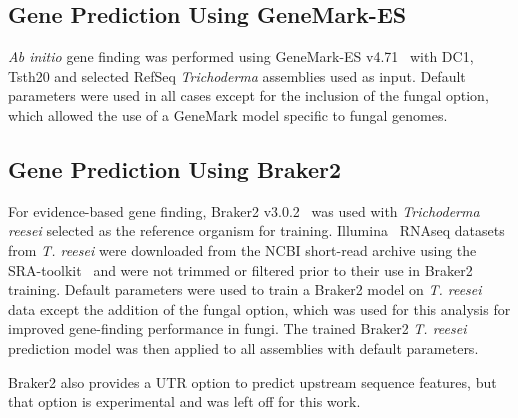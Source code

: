 \subsection{Gene Prediction Using GeneMark-ES}\label{met:genemark}


\textit{Ab initio} gene finding was performed using GeneMark-ES
v4.71~\cite{borodovsky2011a} with DC1, Tsth20 and selected RefSeq
\textit{Trichoderma} assemblies used as input. Default parameters were
used in all cases except for the inclusion of the fungal option, which allowed the use
of a GeneMark model specific to fungal genomes.

%

\subsection{Gene Prediction Using Braker2}\label{met:braker2}

For evidence-based gene finding, Braker2 v3.0.2~\cite{bruna2021a} was
used with \textit{Trichoderma reesei} selected as the reference
organism for
training. Illumina~\cite{bennett2004a}
RNAseq datasets from \textit{T. reesei} were downloaded from the NCBI
short-read archive using the SRA-toolkit~\cite{zotero-item-326} and were not
trimmed or filtered prior to their use in Braker2 training. Default
parameters were used to train a Braker2 model on \textit{T.
  reesei} data except the addition of the fungal option, which was used
for this analysis for improved gene-finding performance in fungi. The
trained Braker2 \textit{T. reesei} prediction model was then applied
to all assemblies with default parameters.

Braker2 also provides a UTR option to predict upstream sequence
features, but that option is experimental and was left off for this
work.


